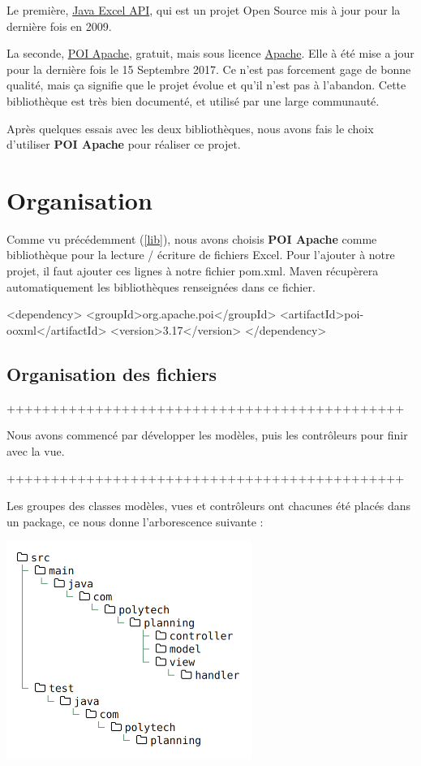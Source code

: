 \documentclass{polytech/polytech}
\begin{document}
	Le première, \href{http://jexcelapi.sourceforge.net/}{Java Excel API}, qui est un projet Open Source mis à jour pour la dernière fois en 2009.

	\label{lib}
	La seconde, \href{http://poi.apache.org}{POI Apache}, gratuit, mais sous licence \href{https://www.apache.org/licenses/}{Apache}.
	Elle à été mise a jour pour la dernière fois le 15 Septembre 2017.
	Ce n'est pas forcement gage de bonne qualité, mais ça signifie que le projet évolue et qu'il n'est pas à l'abandon.
	Cette bibliothèque est très bien documenté, et utilisé par une large communauté.

	Après quelques essais avec les deux bibliothèques, nous avons fais le choix d'utiliser \textbf{POI Apache} pour réaliser ce projet.

	\section{Organisation}

	Comme vu précédemment (\ref{lib}), nous avons choisis \textbf{POI Apache} comme bibliothèque pour la lecture / écriture de fichiers Excel.
	Pour l'ajouter à notre projet, il faut ajouter ces lignes à notre fichier pom.xml.
	Maven récupèrera automatiquement les bibliothèques renseignées dans ce fichier.

	\begin{latexsource}
	<dependency>
		<groupId>org.apache.poi</groupId>
		<artifactId>poi-ooxml</artifactId>
		<version>3.17</version>
	</dependency>
	\end{latexsource}

	\subsection{Organisation des fichiers}
	+++++++++++++++++++++++++++++++++++++++++++++

	Nous avons commencé par développer les modèles, puis les contrôleurs pour finir avec la vue.

	+++++++++++++++++++++++++++++++++++++++++++++

	Les groupes des classes modèles, vues et contrôleurs ont chacunes été placés dans un package, ce nous donne l'arborescence suivante :

	\includegraphics[width=8cm]{./img/folder-planning-w.png}
\end{document}
